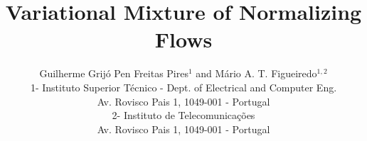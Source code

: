 \documentclass[a4paper]{esannV2}
\begin{document}
\title{Variational Mixture of Normalizing Flows}

\author{Guilherme Grijó Pen Freitas Pires$^1$ and Mário A. T. Figueiredo$^{1,2}$
%
%
\vspace{.3cm}\\
%
1- Instituto Superior Técnico - Dept. of Electrical and Computer Eng. \\
Av. Rovisco Pais 1, 1049-001 - Portugal
%
\vspace{.1cm}\\
2- Instituto de Telecomunicações \\
Av. Rovisco Pais 1, 1049-001 - Portugal
}


\maketitle

\begin{abstract}

\end{abstract}








\begin{footnotesize}



\printbibliography

\end{footnotesize}

\end{document}
